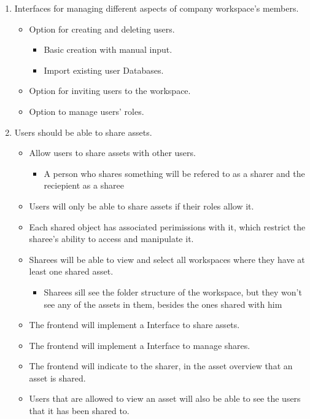 \begin{enumerate}
    \item Interfaces for managing different aspects of company workspace's members.
    \begin{itemize}
        \item Option for creating and deleting users.
        \begin{itemize}
            \item Basic creation with manual input.
            \item Import existing user Databases.
        \end{itemize}
        \item Option for inviting users to the workspace.
        \item Option to manage users' roles.
    \end{itemize}
    
    \item Users should be able to share assets.
    \begin{itemize}
        \item Allow users to share assets with other users.
        \begin{itemize}
            \item A person who shares something will be refered to as a sharer and the reciepient as a sharee
        \end{itemize}
        \item Users will only be able to share assets if their roles allow it.
        \item Each shared object has associated perimissions with it, which restrict the sharee's ability to access and manipulate it.
        \item Sharees will be able to view and select all workspaces where they have at least one shared asset.
        \begin{itemize}
            \item Sharees sill see the folder structure of the workspace, but they won't see any of the assets in them, besides the ones shared with him
        \end{itemize}
        \item The frontend will implement a Interface to share assets.
        \item The frontend will implement a Interface to manage shares.
        \item The frontend will indicate to the sharer, in the asset overview that an asset is shared.
        \item Users that are allowed to view an asset will also be able to see the users that it has been shared to.
    \end{itemize}
\end{enumerate}
